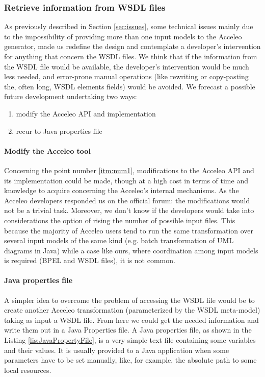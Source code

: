 \subsubsection{Retrieve information from WSDL files}
\label{sec:FutRetrieveWSDLInfo}
As previously described in Section \ref{sec:issues}, some technical issues mainly due to the impossibility of providing more than one input models to the Acceleo generator, made us redefine the design and contemplate a developer's intervention 
for anything that concern the WSDL files.
We think that if the information from the WSDL file would be available, the developer's intervention would be much less needed, and error-prone manual operations (like rewriting or copy-pasting the, often long, WSDL elements fields) would be avoided. 
We forecast a possible future development undertaking two ways:
\begin{enumerate}
 \item \label{itm:num1}modify the Acceleo API and implementation
 \item \label{itm:num2}recur to Java properties file 
\end{enumerate}

\paragraph{Modify the Acceleo tool}
Concerning the point number \ref{itm:num1}, modifications to the Acceleo API and its implementation could be made, though at a high cost in terms of time and knowledge to acquire concerning the Acceleo's internal mechanisms. As the Acceleo developers responded us on the official forum: the modifications would not be a trivial task.
Moreover, we don't know if the developers would take into considerations the option of rising the number of possible input files. This because the majority of Acceleo users tend to run the same transformation over several input models of the same kind (e.g. batch transformation of UML diagrams in Java) while a case like ours, where coordination among input models is required (BPEL and WSDL files), it is not common.

\paragraph{Java properties file}
A simpler idea to overcome the problem of accessing the WSDL file would be to create another Acceleo transformation (parameterized by the WSDL meta-model) taking as input a WSDL file. From here we could get the needed information and write them out in a Java Properties file. A Java properties file, as shown in the Listing \ref{lis:JavaPropertyFile}, is a very simple text file containing some variables and their values. It is usually provided to a Java application when some parameters have to be set manually, like, for example, the absolute path to some local resources.

